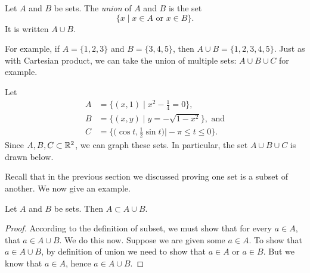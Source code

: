 \documentclass{tufte-book}
\begin{document}
\begin{definition}
  Let $A$ and $B$ be sets. The \emph{union} of $A$ and $B$ is the set
  \[
  \{x \mid x \in A \text{ or } x \in B\}.
  \]
  It is written $A \cup B$.
\end{definition}
For example, if $A = \{1, 2, 3\}$ and $B = \{3, 4, 5\}$, then $A \cup B = \{1, 2, 3, 4, 5\}$. Just as with Cartesian product, we can take the union of multiple sets: $A \cup B \cup C$ for example. 

\begin{example}
  Let 
\begin{align*}
A &= \bigg\{(x, 1) \mid x^2 - \frac14 = 0\bigg\},\\
B &= \{(x, y) \mid y = -\sqrt{1-x^2}\}, \text{ and}\\
C &= \bigg\{\bigg(\cos t, \frac12 \sin t\bigg) \bigg| -\pi \leq t \leq 0\bigg\}.
\end{align*}
Since $A, B, C \subset \mathbb{R}^2$, we can graph these sets. In particular, the set $A \cup B \cup C$ is drawn below.
    \begin{center}
  \end{center}

\end{example}

Recall that in the previous section we discussed proving one set is a subset of another. We now give an example.
\begin{proposition}
  Let $A$ and $B$ be sets. Then $A \subset A \cup B$.
\end{proposition}

\begin{proof}
  According to the definition of subset, we must show that for every $a \in A$, that $a \in A \cup B$. We do this now. Suppose we are given some $a \in A$. To show that $a \in A \cup B$, by definition of union we need to show that $a \in A$ or $a \in B$. But we know that $a \in A$, hence $a \in A \cup B$.
\end{proof}
\end{document}
